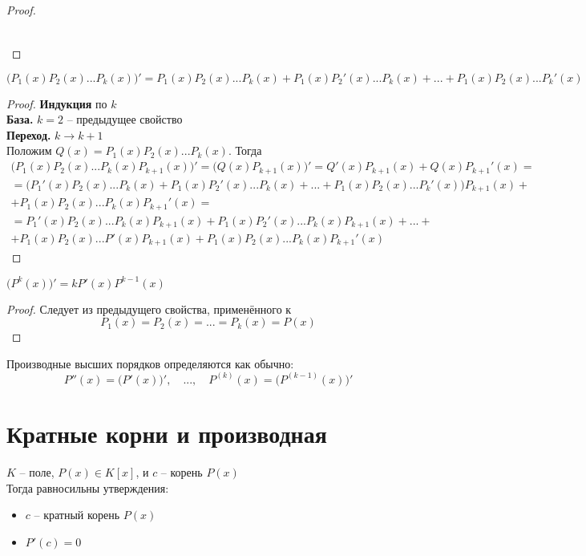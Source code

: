 \begin{props}
\begin{proof}
\begin{itemize}
\begin{multline*}
			\end{multline*}
		\end{itemize}
	\end{proof}
	\begin{implication}
		$$ \bigg( P_1(x)P_2(x)...P_k(x) \bigg)' = P_1(x)P_2(x)...P_k(x) + P_1(x)P_2'(x)...P_k(x) + ... + P_1(x)P_2(x)...P_k'(x) $$
	\end{implication}
	\begin{proof}
		\textbf{Индукция} по $k$ \\
		\textbf{База.} $k = 2$ -- предыдущее свойство \\
		\textbf{Переход.} $k \to k + 1$ \\
		Положим $Q(x) = P_1(x)P_2(x)...P_k(x)$. Тогда
		\begin{multline*}
			\bigg( P_1(x)P_2(x)...P_k(x)P_{k + 1}(x) \bigg)' = \bigg( Q(x)P_{k + 1}(x) \bigg)' = Q'(x)P_{k + 1}(x) + Q(x)P_{k + 1}'(x) = \\ = \bigg( P_1'(x)P_2(x)...P_k(x) + P_1(x)P_2'(x)...P_k(x) + ... + P_1(x)P_2(x)...P_k'(x) \bigg)P_{k + 1}(x) + \\ + P_1(x)P_2(x)...P_k(x)P_{k + 1}'(x) = \\ = P_1'(x)P_2(x)...P_k(x)P_{k + 1}(x) + P_1(x)P_2'(x)...P_k(x)P_{k + 1}(x) + ... + \\ + P_1(x)P_2(x)...P'(x)P_{k + 1}(x) + P_1(x)P_2(x)...P_k(x)P_{k + 1}'(x)
		\end{multline*}
	\end{proof}
	\item $ \bigg(P^k(x) \bigg)' = kP'(x)P^{k - 1}(x) $
	\begin{proof}
		Следует из предыдущего свойства, применённого к
		$$ P_1(x) = P_2(x) = ... = P_k(x) = P(x) $$
	\end{proof}
\end{props}

\begin{note}
	Производные высших порядков определяются как обычно:
	$$ P''(x) = \bigg( P'(x) \bigg)', \quad ..., \quad P^{(k)}(x) = \bigg( P^{(k - 1)}(x) \bigg)' $$
\end{note}

\section{Кратные корни и производная}

\begin{theorem}
	$K$ -- поле, $P(x) \in K[x]$, и $c$ -- корень $P(x)$ \\
	Тогда равносильны утверждения:
	\begin{itemize}
		\item $c$ -- кратный корень $P(x)$
		\item $P'(c) = 0$
	\end{itemize}
\end{theorem}

